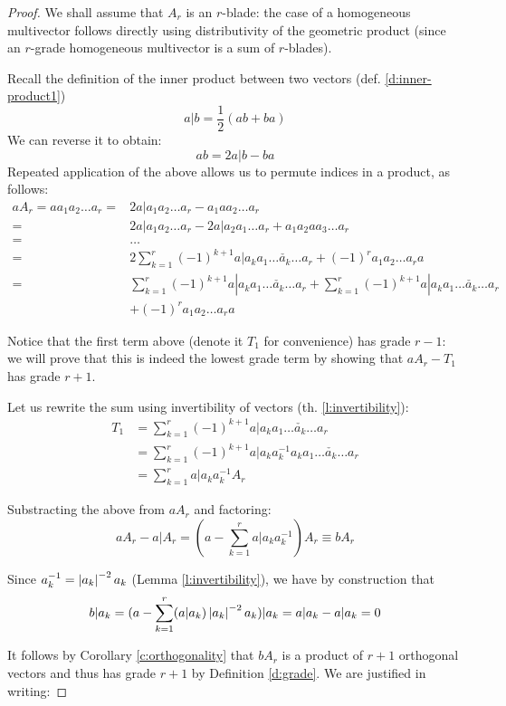 \begin{proof}
	We shall assume that $A_r$ is an $r$-blade: the case of a homogeneous multivector follows directly using distributivity of the geometric product (since an $r$-grade homogeneous multivector is a sum of $r$-blades).

	Recall the definition of the inner product between two vectors (def. \ref{d:inner-product1})
	\[a | b = \frac{1}{2}(ab + ba)\]
	We can reverse it to obtain:
	\[ab = 2 a | b - ba\]
	Repeated application of the above allows us to permute indices in a product, as follows:
	\begin{align*}
		aA_r = aa_1a_2 \ldots a_r = &2a|a_1a_2 \ldots a_r - a_1aa_2 \ldots a_r \\
		= &2a|a_1a_2 \ldots a_r - 2a|a_2a_1 \ldots a_r + a_1a_2aa_3 \ldots a_r \\
		= &\ldots \\
		= &2 \sum_{k=1}^r (-1)^{k+1}a|a_k a_1 \ldots \check{a_k} \ldots a_r + (-1)^ra_1a_2 \ldots a_ra \\
		= &\sum_{k=1}^r (-1)^{k+1}a|a_k a_1 \ldots \check{a_k} \ldots a_r + \sum_{k=1}^r (-1)^{k+1}a|a_k a_1 \ldots \check{a_k} \ldots a_r \\
		&+ (-1)^ra_1a_2 \ldots a_ra
	\end{align*}

	Notice that the first term above (denote it $T_1$ for convenience) has grade $r-1$: we will prove that this is indeed the lowest grade term by showing that $aA_r - T_1$ has grade $r+1$.
	
	Let us rewrite the sum using invertibility of vectors (th. \ref{l:invertibility}):
	\begin{align*}
		T_1 &= \sum_{k=1}^r (-1)^{k+1}a|a_k a_1 \ldots \check{a_k} \ldots a_r\\
				&= \sum_{k=1}^r (-1)^{k+1}a|a_k a_k^{-1}a_k a_1 \ldots \check{a_k} \ldots a_r\\
				&= \sum_{k=1}^r a|a_k a_k^{-1} A_r 
	\end{align*}

	Substracting the above from $aA_r$ and factoring:
	\[aA_r - a | A_r = (a - \sum_{k=1}^r a|a_k a_k^{-1})A_r \equiv bA_r\]
	
	Since $a_k^{-1} = \left|a_k\right|^{-2}a_k$ (Lemma \ref{l:invertibility}), we have by construction that
	\[b | a_k = (a - \sum_{k=1}^r (a|a_k) \left|a_k\right|^{-2}a_k)|a_k = a|a_k - a|a_k  = 0 \]

	It follows by Corollary \ref{c:orthogonality} that $bA_r$ is a product of $r+1$ orthogonal vectors and thus has grade $r+1$ by Definition \ref{d:grade}. We are justified in writing:


\end{proof}
